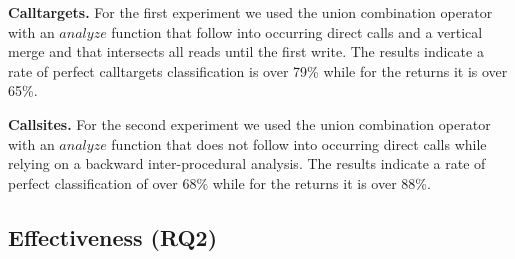 \textbf{Calltargets.} 
For the first experiment we used the union combination operator with an $analyze$ function that follow into occurring direct calls 
and a vertical merge and that intersects all reads until the first write.
The results indicate a rate of perfect calltargets classification is over 79\% while for the returns it is over 65\%.

\textbf{Callsites.} 
For the second experiment we used the union combination operator with an $analyze$ function that does not follow into occurring direct calls while relying on a backward inter-procedural analysis.
The results indicate a rate of perfect classification of over 68\% while for the returns it is over 88\%.

\subsection{Effectiveness (RQ2)}
\label{section:typeshieldeffectiveness}

